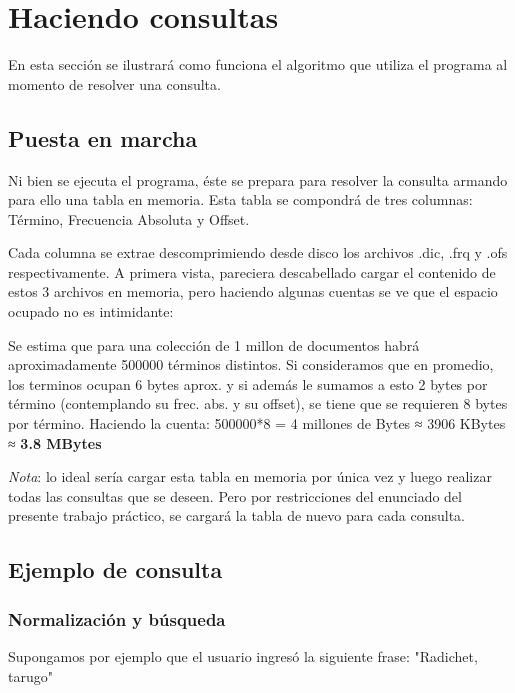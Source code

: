 \section{Haciendo consultas}

En esta sección se ilustrará como funciona el algoritmo que utiliza el programa al momento de resolver una consulta.

\subsection{Puesta en marcha}

Ni bien se ejecuta el programa, éste se prepara para resolver la consulta armando para ello una tabla en memoria. Esta tabla se compondrá de tres columnas: Término, Frecuencia Absoluta y Offset.

Cada columna se extrae descomprimiendo desde disco los archivos .dic, .frq y .ofs respectivamente.
A primera vista, pareciera descabellado cargar el contenido de estos 3 archivos en memoria, pero haciendo algunas cuentas se ve que el espacio ocupado no es intimidante:

Se estima que para una colección de 1 millon de documentos habrá aproximadamente 500000 términos distintos. Si consideramos que en promedio, los terminos ocupan 6 bytes aprox. y si además le sumamos a esto 2 bytes por término (contemplando su frec. abs. y su offset), se tiene que se requieren 8 bytes por término. Haciendo la cuenta: 500000*8 = 4 millones de Bytes ≈ 3906 KBytes ≈ \textbf{3.8 MBytes}

\textit{Nota}: lo ideal sería cargar esta tabla en memoria por única vez y luego realizar todas las consultas que se deseen. Pero por restricciones del enunciado del presente trabajo práctico, se cargará la tabla de nuevo para cada consulta.

\subsection{Ejemplo de consulta}

\subsubsection{Normalización y búsqueda}

Supongamos por ejemplo que el usuario ingresó la siguiente frase: "Radichet, tarugo"

